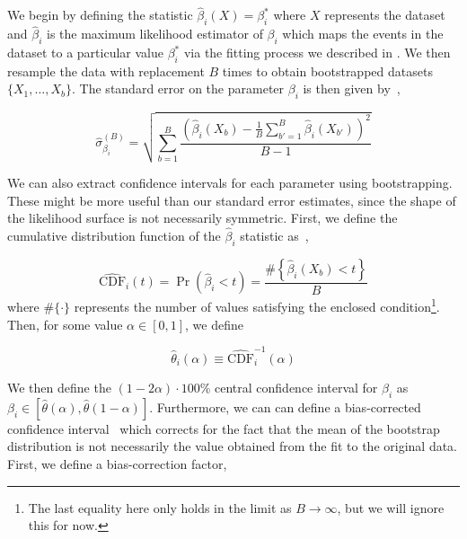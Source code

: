 We begin by defining the statistic $\hat{\beta}_i(X) = \beta_i^*$ where $X$ represents the dataset and $\hat{\beta}_i$ is the maximum likelihood estimator of $\beta_i$ which maps the events in the dataset to a particular value $\beta_i^*$ via the fitting process we described in . We then resample the data with replacement $B$ times to obtain bootstrapped datasets $\{X_1,\ldots,X_b\}$. The standard error on the parameter $\beta_i$ is then given by~\cite{efron_nonparametric_1981},

\begin{equation}
  \hat{\sigma}_{\beta_i}^{(B)} = \sqrt{\sum_{b=1}^{B}\frac{\left(\hat{\beta}_i(X_b) - \frac{1}{B}\sum_{b'=1}^{B} \hat{\beta}_i(X_{b'}) \right)^2}{B-1}}
  \label{eq:bootstrap-standard-error}
\end{equation}

We can also extract confidence intervals for each parameter using bootstrapping. These might be more useful than our standard error estimates, since the shape of the likelihood surface is not necessarily symmetric. First, we define the cumulative distribution function of the $\hat{\beta}_i$ statistic as~\cite{efron_nonparametric_1981},

\begin{equation}
  \hat{\text{CDF}}_i(t) = \Pr(\hat{\beta}_i < t) = \frac{\#\left\{\hat{\beta}_i(X_b) < t\right\}}{B}
\end{equation}
where $\#\{\cdot\}$ represents the number of values satisfying the enclosed condition\footnote{The last equality here only holds in the limit as $B\to\infty$, but we will ignore this for now.}. Then, for some value $\alpha \in [0, 1]$, we define

\begin{equation}
  \hat{\theta}_i(\alpha) \equiv \hat{\text{CDF}}_i^{-1}(\alpha)
\end{equation}

We then define the $(1 - 2\alpha)\cdot 100\%$ central confidence interval for $\beta_i$ as $\beta_i \in [\hat{\theta}(\alpha),\hat{\theta}(1 - \alpha)]$. Furthermore, we can can define a bias-corrected confidence interval~\cite{efron_nonparametric_1981} which corrects for the fact that the mean of the bootstrap distribution is not necessarily the value obtained from the fit to the original data. First, we define a bias-correction factor,

